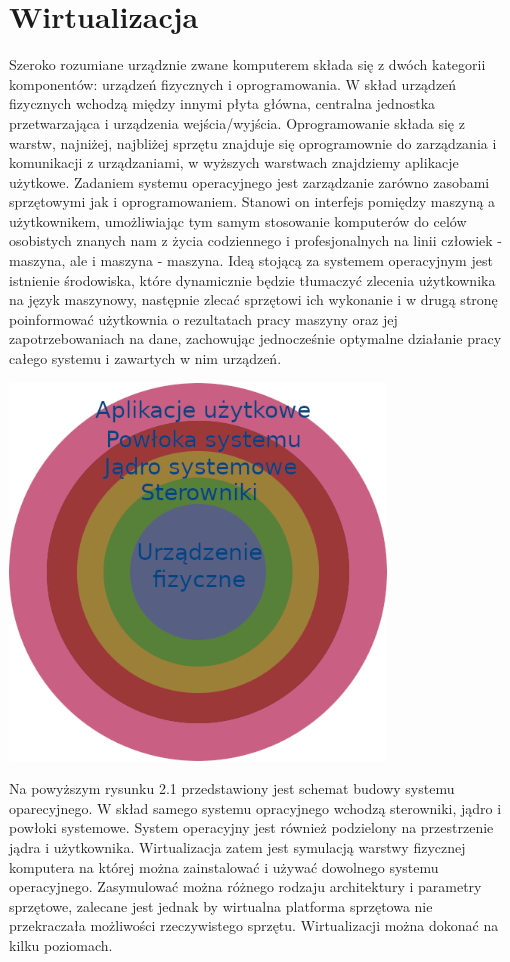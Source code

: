 \documentclass[polish, a4paper, 12pt, oneside]{book}
\begin{document}
\section{Wirtualizacja}
Szeroko rozumiane urządznie zwane komputerem składa się z dwóch kategorii komponentów: urządzeń fizycznych i oprogramowania. W skład urządzeń fizycznych wchodzą między innymi płyta główna, centralna jednostka przetwarzająca i urządzenia wejścia/wyjścia. Oprogramowanie składa się z warstw, najniżej, najbliżej sprzętu znajduje się oprogramownie do zarządzania i komunikacji z urządzaniami, w wyższych warstwach znajdziemy aplikacje użytkowe. Zadaniem systemu operacyjnego jest zarządzanie zarówno zasobami sprzętowymi jak i oprogramowaniem. Stanowi on interfejs pomiędzy maszyną a użytkownikem, umożliwiając tym samym stosowanie komputerów do celów osobistych znanych nam z życia codziennego i profesjonalnych na linii człowiek - maszyna, ale i maszyna - maszyna. Ideą stojącą za systemem operacyjnym jest istnienie środowiska, które dynamicznie będzie tłumaczyć zlecenia użytkownika na język maszynowy, następnie zlecać sprzętowi ich wykonanie i w drugą stronę poinformować użytkownia o rezultatach pracy maszyny oraz jej zapotrzebowaniach na dane, zachowując jednocześnie optymalne działanie pracy całego systemu i zawartych w nim urządzeń.
   
\begin{center}
\includegraphics[height=100mm]{schemat_os.png}
\end{center}

Na powyższym rysunku 2.1 przedstawiony jest schemat budowy systemu oparecyjnego. W skład samego systemu opracyjnego wchodzą sterowniki, jądro i powłoki systemowe. System operacyjny jest również podzielony na przestrzenie jądra i użytkownika. Wirtualizacja zatem jest symulacją warstwy fizycznej komputera na której można zainstalować i używać dowolnego systemu operacyjnego. Zasymulować można różnego rodzaju architektury i parametry sprzętowe, zalecane jest jednak by wirtualna platforma sprzętowa nie przekraczała możliwości rzeczywistego sprzętu. Wirtualizacji można dokonać na kilku poziomach. 
\end{document}
